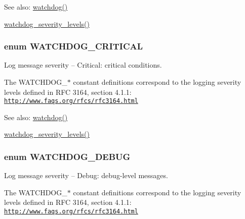 \begin{Desc}
\item[See also:]\hyperlink{bootstrap_8inc_cb7338e6740302727043d64e3ae1257b}{watchdog()} 

\hyperlink{common_8inc_fb5d4b58ec7e483153644c0f664e0ca4}{watchdog\_\-severity\_\-levels()} \end{Desc}
\hypertarget{bootstrap_8inc_b4129b98c8480bea3cbcd62083ae81e3}{
\subsubsection[{WATCHDOG\_\-CRITICAL}]{\setlength{\rightskip}{0pt plus 5cm}enum {\bf WATCHDOG\_\-CRITICAL}}}
\label{bootstrap_8inc_b4129b98c8480bea3cbcd62083ae81e3}


Log message severity -- Critical: critical conditions.

The WATCHDOG\_\-$\ast$ constant definitions correspond to the logging severity levels defined in RFC 3164, section 4.1.1: \href{http://www.faqs.org/rfcs/rfc3164.html}{\tt http://www.faqs.org/rfcs/rfc3164.html}

\begin{Desc}
\item[See also:]\hyperlink{bootstrap_8inc_cb7338e6740302727043d64e3ae1257b}{watchdog()} 

\hyperlink{common_8inc_fb5d4b58ec7e483153644c0f664e0ca4}{watchdog\_\-severity\_\-levels()} \end{Desc}
\hypertarget{bootstrap_8inc_f672cd38d5654f8a4a12e32d9b9e749d}{
\subsubsection[{WATCHDOG\_\-DEBUG}]{\setlength{\rightskip}{0pt plus 5cm}enum {\bf WATCHDOG\_\-DEBUG}}}
\label{bootstrap_8inc_f672cd38d5654f8a4a12e32d9b9e749d}


Log message severity -- Debug: debug-level messages.

The WATCHDOG\_\-$\ast$ constant definitions correspond to the logging severity levels defined in RFC 3164, section 4.1.1: \href{http://www.faqs.org/rfcs/rfc3164.html}{\tt http://www.faqs.org/rfcs/rfc3164.html}

